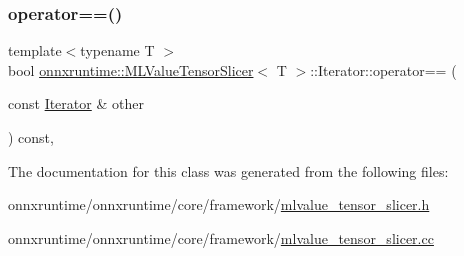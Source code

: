 \mbox{\label{classonnxruntime_1_1MLValueTensorSlicer_1_1Iterator_a6aea224055665bfbb5f538060a4cdd75}} 
\subsubsection{\texorpdfstring{operator==()}{operator==()}}
{\footnotesize\ttfamily template$<$typename T $>$ \\
bool \mbox{\hyperlink{classonnxruntime_1_1MLValueTensorSlicer}{onnxruntime\+::\+M\+L\+Value\+Tensor\+Slicer}}$<$ T $>$\+::Iterator\+::operator== (\begin{DoxyParamCaption}\item[{const \mbox{\hyperlink{classonnxruntime_1_1MLValueTensorSlicer_1_1Iterator}{Iterator}} \&}]{other }\end{DoxyParamCaption}) const\hspace{0.3cm}{\ttfamily [inline]}, {\ttfamily [noexcept]}}



The documentation for this class was generated from the following files\+:\begin{DoxyCompactItemize}
\item 
onnxruntime/onnxruntime/core/framework/\mbox{\hyperlink{mlvalue__tensor__slicer_8h}{mlvalue\+\_\+tensor\+\_\+slicer.\+h}}\item 
onnxruntime/onnxruntime/core/framework/\mbox{\hyperlink{mlvalue__tensor__slicer_8cc}{mlvalue\+\_\+tensor\+\_\+slicer.\+cc}}\end{DoxyCompactItemize}
